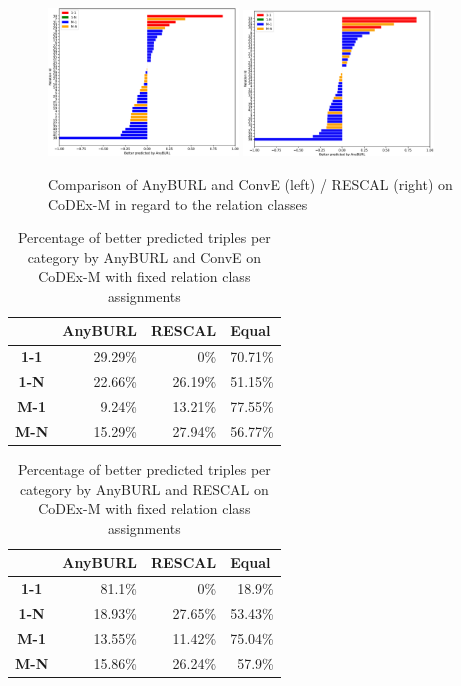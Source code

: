 \begin{figure}[H]
\centering
\includegraphics[width=0.45\textwidth]{images/relation_class_anyburl_conve_codex.PNG}
\includegraphics[width=0.45\textwidth]{images/relation_class_anyburl_rescal_codex.PNG}
\caption{Comparison of AnyBURL and ConvE (left) / RESCAL (right) on CoDEx-M in regard to the relation classes}
\label{fig:relation_class_anyburl_conve_rescal_codex}
\end{figure}

\begin{table}[H]
\centering
\begin{tabular}{c|rrr}
\multicolumn{1}{l|}{} & \multicolumn{1}{c}{\textbf{AnyBURL}} & \multicolumn{1}{c}{\textbf{RESCAL}} & \multicolumn{1}{l}{\textbf{Equal}} \\ \hline
\textbf{1-1} & 29.29\% & 0\% & 70.71\% \\
\textbf{1-N} & 22.66\% & 26.19\% & 51.15\% \\
\textbf{M-1} & 9.24\% & 13.21\% & 77.55\% \\
\textbf{M-N} & 15.29\% & 27.94\% & 56.77\%
\end{tabular}
\caption{Percentage of better predicted triples per category by AnyBURL and ConvE on CoDEx-M with fixed relation class assignments}
\label{tab:relation_class_cleaned_anyburl_conve_codex}
\end{table}

\begin{table}[H]
\centering
\begin{tabular}{c|rrr}
\multicolumn{1}{l|}{} & \multicolumn{1}{c}{\textbf{AnyBURL}} & \multicolumn{1}{c}{\textbf{RESCAL}} & \multicolumn{1}{l}{\textbf{Equal}} \\ \hline
\textbf{1-1} & 81.1\% & 0\% & 18.9\% \\
\textbf{1-N} & 18.93\% & 27.65\% & 53.43\% \\
\textbf{M-1} & 13.55\% & 11.42\% & 75.04\% \\
\textbf{M-N} & 15.86\% & 26.24\% & 57.9\%
\end{tabular}
\caption{Percentage of better predicted triples per category by AnyBURL and RESCAL on CoDEx-M with fixed relation class assignments}
\label{tab:relation_class_cleaned_anyburl_rescal_codex}
\end{table}

